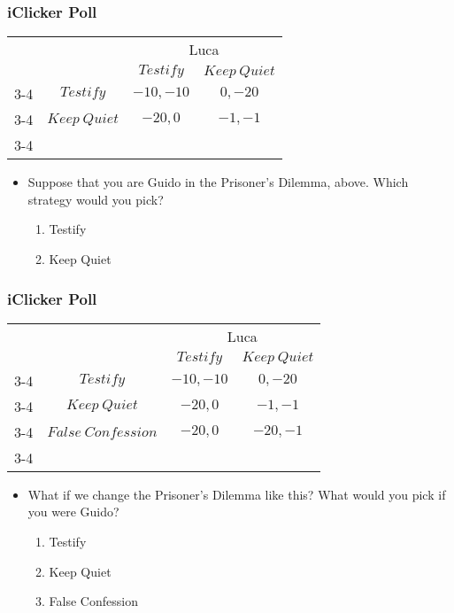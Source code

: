 
\begin{frame}
\frametitle{iClicker Poll}
\begin{table}[h]
	\centering
	\begin{tabular}{cc|c|c|}
		& \multicolumn{1}{c}{} & \multicolumn{2}{c}{Luca}\\
		& \multicolumn{1}{c}{} & \multicolumn{1}{c}{$Testify$}  & \multicolumn{1}{c}{$Keep~Quiet$} \\\cline{3-4}
		\multirow{Guido}  & $Testify$ & $-10,-10$ & $0,-20$ \\\cline{3-4}
		& $Keep~Quiet$ & $-20,0$ & $-1,-1$ \\\cline{3-4}
	\end{tabular}
\end{table}
\begin{itemize}
	\item Suppose that you are Guido in the Prisoner's Dilemma, above. Which strategy would you pick?
	\begin{enumerate}
		\item Testify
		\item Keep Quiet
	\end{enumerate}
\end{itemize}
\end{frame}

\begin{frame}
\frametitle{iClicker Poll}
\begin{table}[h]
\centering
\begin{tabular}{cc|c|c|}
	& \multicolumn{1}{c}{} & \multicolumn{2}{c}{Luca}\\
	& \multicolumn{1}{c}{} & \multicolumn{1}{c}{$Testify$}  & \multicolumn{1}{c}{$Keep~Quiet$} \\\cline{3-4}
	\multirow{Guido}  & $Testify$ & $-10,-10$ & $0,-20$ \\\cline{3-4}
	& $Keep~Quiet$ & $-20,0$ & $-1,-1$ \\\cline{3-4}
	& $False~Confession$ & $-20, 0$ & $-20, -1$ \\\cline{3-4}
\end{tabular}
\end{table}
\begin{itemize}
\item What if we change the Prisoner's Dilemma like this? What would you pick if you were Guido?
\begin{enumerate}
	\item Testify
	\item Keep Quiet
	\item False Confession
\end{enumerate}
\end{itemize}
\end{frame}

